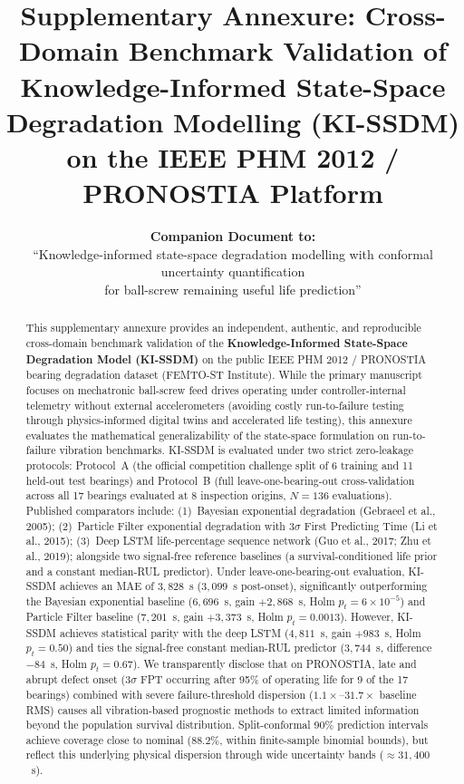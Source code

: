 \documentclass[11pt,a4paper]{article}
\title{\textbf{Supplementary Annexure: Cross-Domain Benchmark Validation of Knowledge-Informed State-Space Degradation Modelling (KI-SSDM) on the IEEE PHM 2012 / PRONOSTIA Platform}}
\author{\textbf{Companion Document to:}\\
``Knowledge-informed state-space degradation modelling with conformal uncertainty quantification\\
for ball-screw remaining useful life prediction''}
\date{}
\begin{document}
\maketitle

\begin{abstract}
This supplementary annexure provides an independent, authentic, and reproducible cross-domain benchmark validation of the \textbf{Knowledge-Informed State-Space Degradation Model (KI-SSDM)} on the public IEEE PHM 2012 / PRONOSTIA bearing degradation dataset (FEMTO-ST Institute). While the primary manuscript focuses on mechatronic ball-screw feed drives operating under controller-internal telemetry without external accelerometers (avoiding costly run-to-failure testing through physics-informed digital twins and accelerated life testing), this annexure evaluates the mathematical generalizability of the state-space formulation on run-to-failure vibration benchmarks. KI-SSDM is evaluated under two strict zero-leakage protocols: Protocol~A (the official competition challenge split of 6 training and 11 held-out test bearings) and Protocol~B (full leave-one-bearing-out cross-validation across all 17 bearings evaluated at 8 inspection origins, $N=136$ evaluations). Published comparators include: (1)~Bayesian exponential degradation (Gebraeel et al., 2005); (2)~Particle Filter exponential degradation with $3\sigma$ First Predicting Time (Li et al., 2015); (3)~Deep LSTM life-percentage sequence network (Guo et al., 2017; Zhu et al., 2019); alongside two signal-free reference baselines (a survival-conditioned life prior and a constant median-RUL predictor). Under leave-one-bearing-out evaluation, KI-SSDM achieves an MAE of $3{,}828$~s ($3{,}099$~s post-onset), significantly outperforming the Bayesian exponential baseline ($6{,}696$~s, gain $+2{,}868$~s, Holm $p_t = 6 \times 10^{-5}$) and Particle Filter baseline ($7{,}201$~s, gain $+3{,}373$~s, Holm $p_t = 0.0013$). However, KI-SSDM achieves statistical parity with the deep LSTM ($4{,}811$~s, gain $+983$~s, Holm $p_t = 0.50$) and ties the signal-free constant median-RUL predictor ($3{,}744$~s, difference $-84$~s, Holm $p_t = 0.67$). We transparently disclose that on PRONOSTIA, late and abrupt defect onset ($3\sigma$ FPT occurring after 95\% of operating life for 9 of the 17 bearings) combined with severe failure-threshold dispersion ($1.1\times\text{--}31.7\times$ baseline RMS) causes all vibration-based prognostic methods to extract limited information beyond the population survival distribution. Split-conformal 90\% prediction intervals achieve coverage close to nominal ($88.2\%$, within finite-sample binomial bounds), but reflect this underlying physical dispersion through wide uncertainty bands ($\approx 31{,}400$~s).
\end{abstract}
\end{document}

